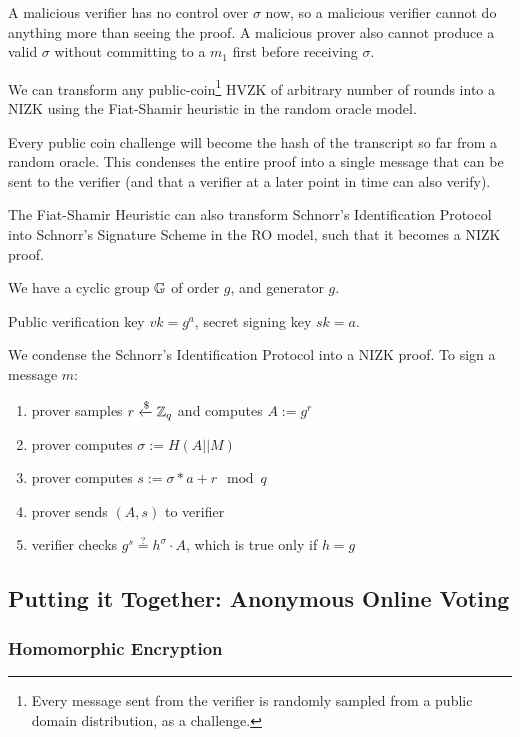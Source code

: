 A malicious verifier has no control over $\sigma$ now, so a malicious verifier cannot do anything more than seeing the proof. A malicious prover also cannot produce a valid $\sigma$ without committing to a $m_1$ first before receiving $\sigma$.

We can transform any public-coin\footnote{Every message sent from the verifier is randomly sampled from a public domain distribution, as a challenge.} HVZK of arbitrary number of rounds into a NIZK using the Fiat-Shamir heuristic in the random oracle model.

Every public coin challenge will become the hash of the transcript so far from a random oracle. This condenses the entire proof into a single message that can be sent to the verifier (and that a verifier at a later point in time can also verify).

\begin{example}
    The Fiat-Shamir Heuristic can also transform Schnorr's Identification Protocol into Schnorr's Signature Scheme in the RO model, such that it becomes a NIZK proof.

    We have a cyclic group $\mathbb G$ of order $g$, and generator $g$.

    Public verification key $vk = g^a$, secret signing key $sk = a$.

    We condense the Schnorr's Identification Protocol into a NIZK proof. To sign a message $m$:
    \begin{enumerate}
        \item prover samples $r \xleftarrow{\$} \mathbb Z_q$ and computes $A := g^r$
        \item prover computes $\sigma := H(A||M)$
        \item prover computes $s := \sigma * a + r \mod{q}$
        \item prover sends $(A, s)$ to verifier
        \item verifier checks $g^s \stackrel{?}{=} h^\sigma \cdot A$, which is true only if $h = g$
    
    \end{enumerate}
\end{example}

\subsection{Putting it Together: Anonymous Online Voting}

\subsubsection{Homomorphic Encryption}

